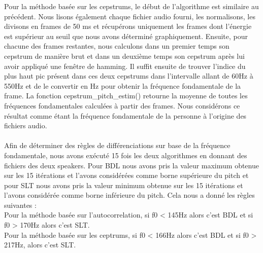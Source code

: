 \documentclass[a4paper,12pt]{report}	%
\begin{document}
Pour la méthode basée sur les cepstrums, le début de l'algorithme est similaire au précédent. Nous lisons également chaque fichier audio fourni, les normalisons, les divisons en frames de 50 ms et récupérons uniquement les frames dont l'énergie est supérieur au seuil que nous avons déterminé graphiquement. Ensuite, pour chacune des frames restantes, nous calculons dans un premier temps son cepstrum de manière brut et dans un deuxième temps son cepstrum après lui avoir appliqué une fenêtre de hamming. Il suffit ensuite de trouver l'indice du plus haut pic présent dans ces deux cepstrums dans l'intervalle allant de 60Hz à 550Hz et de le convertir en Hz pour obtenir la fréquence fondamentale de la frame. La fonction cepstrum\_pitch\_estim() retourne la moyenne de toutes les fréquences fondamentales calculées à partir des frames. Nous considérons ce résultat comme étant la fréquence fondamentale de la personne à l'origine des fichiers audio.\\
\\
Afin de déterminer des règles de différenciations sur base de la fréquence fondamentale, nous avons exécuté 15 fois les deux algorithmes en donnant des fichiers des deux speakers. Pour BDL nous avons pris la valeur maximum obtenue sur les 15 itérations et l'avons considérées comme borne supérieure du pitch et pour SLT nous avons pris la valeur minimum obtenue sur les 15 itérations et l'avons considérée comme borne inférieure du pitch. Cela nous a donné les règles suivantes : \\
Pour la méthode basée sur l'autocorrelation, si f0 < 145Hz alors c'est BDL et si f0 > 170Hz alors c'est SLT. \\
Pour la méthode basée sur les ceptrums, si f0 < 166Hz alors c'est BDL et si f0 > 217Hz, alors c'est SLT. 
\end{document}
